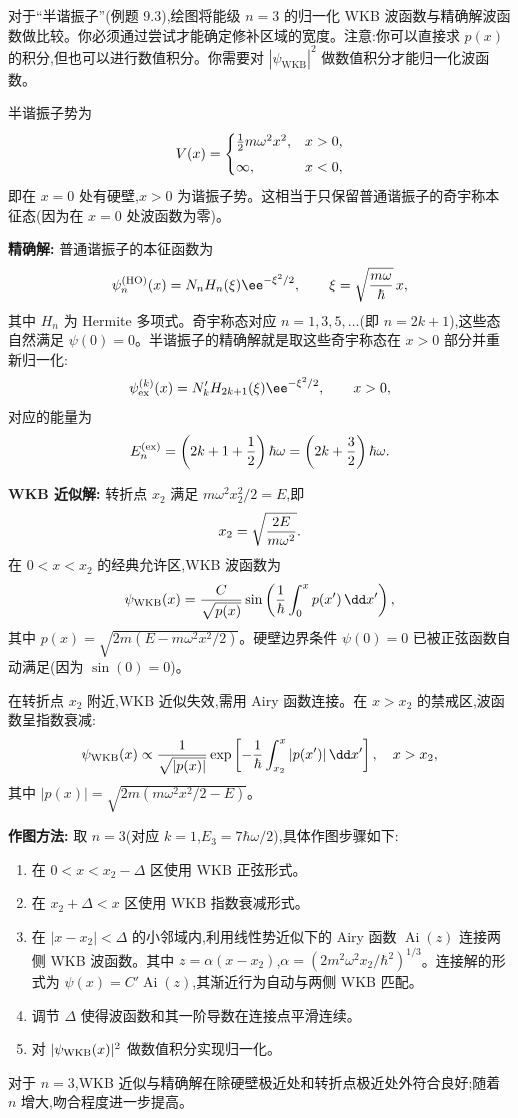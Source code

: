 \begin{question}
对于“半谐振子”(例题 9.3),绘图将能级 $n=3$ 的归一化 WKB 波函数与精确解波函数做比较。你必须通过尝试才能确定修补区域的宽度。注意:你可以直接求 $p(x)$ 的积分,但也可以进行数值积分。你需要对 $|\psi_{\mathrm{WKB}}|^2$ 做数值积分才能归一化波函数。
\end{question}
\begin{solution}
半谐振子势为
\[
V(x)=\begin{cases}
{1\over2}m\omega^2x^2, & x>0,\\[4pt]
\infty, & x<0,
\end{cases}
\]
即在 $x=0$ 处有硬壁,$x>0$ 为谐振子势。这相当于只保留普通谐振子的奇宇称本征态(因为在 $x=0$ 处波函数为零)。

\textbf{精确解:} 普通谐振子的本征函数为
\[
\psi_n^{\rm (HO)}(x)=N_n H_n(\xi)\ee^{-\xi^2/2},
\qquad \xi=\sqrt{m\omega\over\hbar}\,x,
\]
其中 $H_n$ 为 Hermite 多项式。奇宇称态对应 $n=1,3,5,\ldots$(即 $n=2k+1$),这些态自然满足 $\psi(0)=0$。半谐振子的精确解就是取这些奇宇称态在 $x>0$ 部分并重新归一化:
\[
\psi_{\rm ex}^{(k)}(x)=N_k' H_{2k+1}(\xi)\ee^{-\xi^2/2},\qquad x>0,
\]
对应的能量为
\[
E_n^{\rm (ex)}=\left(2k+1+{1\over2}\right)\hbar\omega
=\left(2k+{3\over2}\right)\hbar\omega.
\]

\textbf{WKB 近似解:} 转折点 $x_2$ 满足 $m\omega^2x_2^2/2=E$,即
\[
x_2=\sqrt{2E\over m\omega^2}.
\]
在 $0<x<x_2$ 的经典允许区,WKB 波函数为
\[
\psi_{\rm WKB}(x)={C\over\sqrt{p(x)}}
\sin\left({1\over\hbar}\int_0^x p(x')\,\dd x'\right),
\]
其中 $p(x)=\sqrt{2m(E-m\omega^2x^2/2)}$。硬壁边界条件 $\psi(0)=0$ 已被正弦函数自动满足(因为 $\sin(0)=0$)。

在转折点 $x_2$ 附近,WKB 近似失效,需用 Airy 函数连接。在 $x>x_2$ 的禁戒区,波函数呈指数衰减:
\[
\psi_{\rm WKB}(x)\propto {1\over\sqrt{|p(x)|}}
\exp\left[-{1\over\hbar}\int_{x_2}^{x}|p(x')|\,\dd x'\right],
\quad x>x_2,
\]
其中 $|p(x)|=\sqrt{2m(m\omega^2x^2/2-E)}$。

\textbf{作图方法:} 取 $n=3$(对应 $k=1$,$E_3=7\hbar\omega/2$),具体作图步骤如下:
\begin{enumerate}
\item 在 $0<x<x_2-\Delta$ 区使用 WKB 正弦形式。
\item 在 $x_2+\Delta<x$ 区使用 WKB 指数衰减形式。
\item 在 $|x-x_2|<\Delta$ 的小邻域内,利用线性势近似下的 Airy 函数 $\operatorname{Ai}(z)$ 连接两侧 WKB 波函数。其中 $z=\alpha(x-x_2)$,$\alpha=(2m^2\omega^2x_2/\hbar^2)^{1/3}$。连接解的形式为 $\psi(x)=C'\operatorname{Ai}(z)$,其渐近行为自动与两侧 WKB 匹配。
\item 调节 $\Delta$ 使得波函数和其一阶导数在连接点平滑连续。
\item 对 $|\psi_{\rm WKB}(x)|^2$ 做数值积分实现归一化。
\end{enumerate}

对于 $n=3$,WKB 近似与精确解在除硬壁极近处和转折点极近处外符合良好;随着 $n$ 增大,吻合程度进一步提高。
\end{solution}

